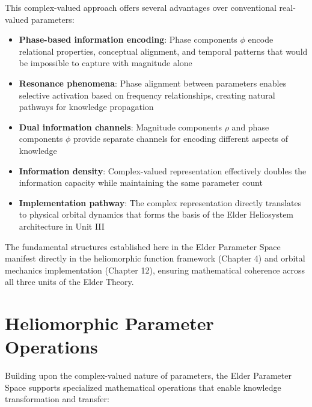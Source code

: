 This complex-valued approach offers several advantages over conventional real-valued parameters:
\begin{itemize}
    \item \textbf{Phase-based information encoding}: Phase components $\phi$ encode relational properties, conceptual alignment, and temporal patterns that would be impossible to capture with magnitude alone
    
    \item \textbf{Resonance phenomena}: Phase alignment between parameters enables selective activation based on frequency relationships, creating natural pathways for knowledge propagation
    
    \item \textbf{Dual information channels}: Magnitude components $\rho$ and phase components $\phi$ provide separate channels for encoding different aspects of knowledge
    
    \item \textbf{Information density}: Complex-valued representation effectively doubles the information capacity while maintaining the same parameter count
    
    \item \textbf{Implementation pathway}: The complex representation directly translates to physical orbital dynamics that forms the basis of the Elder Heliosystem architecture in Unit III
\end{itemize}

\begin{remark}
The fundamental structures established here in the Elder Parameter Space manifest directly in the heliomorphic function framework (Chapter 4) and orbital mechanics implementation (Chapter 12), ensuring mathematical coherence across all three units of the Elder Theory.
\end{remark}

\section{Heliomorphic Parameter Operations}

Building upon the complex-valued nature of parameters, the Elder Parameter Space supports specialized mathematical operations that enable knowledge transformation and transfer:

